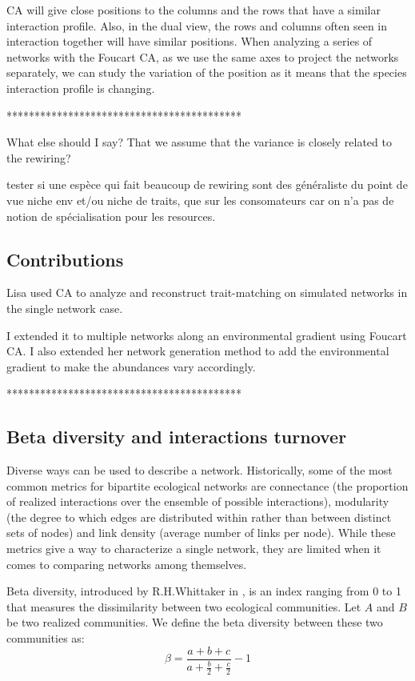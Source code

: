 CA will give close positions to the columns and the rows that have a similar interaction profile. Also, in the dual view, the rows and columns often seen in interaction together will have similar positions. When analyzing a series of networks with the Foucart CA, as we use the same axes to  project the networks separately, we can study the variation of the position as it means that the species interaction profile is changing.

******************************************

What else should I say?  That we assume that the variance is closely related to the rewiring?


tester si une espèce qui fait beaucoup de rewiring sont des généraliste du point de vue niche env et/ou niche de traits, que sur les consomateurs car on n'a pas de notion de spécialisation pour les resources.

\subsection{Contributions}

Lisa used CA to analyze and reconstruct trait-matching on simulated networks in the single network case.

I extended it to multiple networks along an environmental gradient using Foucart CA. I also extended her network generation method to add the environmental gradient to make the abundances vary accordingly.  

******************************************

\subsection{Beta diversity and interactions turnover}

Diverse ways can be used to describe a network. Historically, some of the most common metrics for bipartite ecological networks are connectance (the proportion of realized interactions over the ensemble of possible interactions), modularity (the degree to which edges are distributed within rather than between distinct sets of nodes) and link density (average number of links per node). While these metrics give a way to characterize a single network, they are limited when it comes to comparing networks among themselves.

Beta diversity, introduced by R.H.Whittaker in \cite{whittaker_vegetation_1960}, is an index ranging from 0 to 1 that measures the dissimilarity between two ecological communities. Let $A$ and $B$ be two realized communities. We define the beta diversity between these two communities as: 
$$
    \beta = \frac{a+b+c}{a+\frac{b}{2} + \frac{c}{2}} - 1
$$

